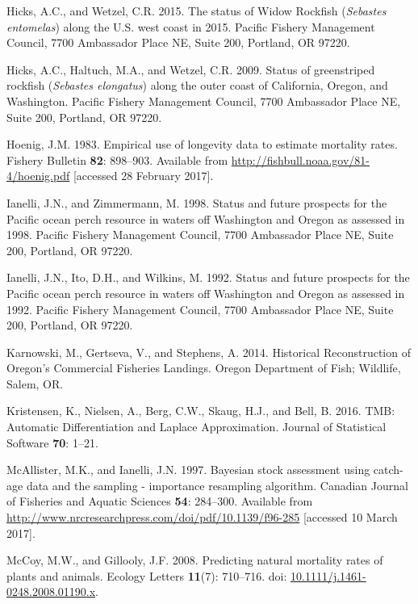 \documentclass[12pt,]{article}
\begin{document}
\hypertarget{ref-hicks_status_2015}{}
Hicks, A.C., and Wetzel, C.R. 2015. The status of Widow Rockfish
(\emph{Sebastes entomelas}) along the U.S. west coast in 2015. Pacific
Fishery Management Council, 7700 Ambassador Place NE, Suite 200,
Portland, OR 97220.

\hypertarget{ref-hicks_status_2009}{}
Hicks, A.C., Haltuch, M.A., and Wetzel, C.R. 2009. Status of
greenstriped rockfish (\emph{Sebastes elongatus}) along the outer coast
of California, Oregon, and Washington. Pacific Fishery Management
Council, 7700 Ambassador Place NE, Suite 200, Portland, OR 97220.

\hypertarget{ref-hoenig_empirical_1983}{}
Hoenig, J.M. 1983. Empirical use of longevity data to estimate mortality
rates. Fishery Bulletin \textbf{82}: 898--903. Available from
\url{http://fishbull.noaa.gov/81-4/hoenig.pdf} {[}accessed 28 February
2017{]}.

\hypertarget{ref-ianelli_status_1998}{}
Ianelli, J.N., and Zimmermann, M. 1998. Status and future prospects for
the Pacific ocean perch resource in waters off Washington and Oregon as
assessed in 1998. Pacific Fishery Management Council, 7700 Ambassador
Place NE, Suite 200, Portland, OR 97220.

\hypertarget{ref-ianelli_status_1992}{}
Ianelli, J.N., Ito, D.H., and Wilkins, M. 1992. Status and future
prospects for the Pacific ocean perch resource in waters off Washington
and Oregon as assessed in 1992. Pacific Fishery Management Council, 7700
Ambassador Place NE, Suite 200, Portland, OR 97220.

\hypertarget{ref-karnowski_historical_2014}{}
Karnowski, M., Gertseva, V., and Stephens, A. 2014. Historical
Reconstruction of Oregon's Commercial Fisheries Landings. Oregon
Department of Fish; Wildlife, Salem, OR.

\hypertarget{ref-kristensen_tmb:_2016}{}
Kristensen, K., Nielsen, A., Berg, C.W., Skaug, H.J., and Bell, B. 2016.
TMB: Automatic Differentiation and Laplace Approximation. Journal of
Statistical Software \textbf{70}: 1--21.

\hypertarget{ref-mcallister_bayesian_1997}{}
McAllister, M.K., and Ianelli, J.N. 1997. Bayesian stock assessment
using catch-age data and the sampling - importance resampling algorithm.
Canadian Journal of Fisheries and Aquatic Sciences \textbf{54}:
284--300. Available from
\url{http://www.nrcresearchpress.com/doi/pdf/10.1139/f96-285}
{[}accessed 10 March 2017{]}.

\hypertarget{ref-mccoy_predicting_2008}{}
McCoy, M.W., and Gillooly, J.F. 2008. Predicting natural mortality rates
of plants and animals. Ecology Letters \textbf{11}(7): 710--716. doi:
\href{https://doi.org/10.1111/j.1461-0248.2008.01190.x}{10.1111/j.1461-0248.2008.01190.x}.
\end{document}
